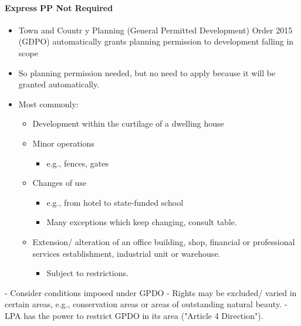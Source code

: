 \documentclass[
]{article}
\newenvironment{Shaded}{}{}
\newcommand{\NormalTok}[1]{#1}
\providecommand{\tightlist}{%
  \setlength{\itemsep}{0pt}\setlength{\parskip}{0pt}}
\begin{document}
\hypertarget{express-pp-not-required}{%
\paragraph{Express PP Not Required}\label{express-pp-not-required}}

\begin{itemize}
\tightlist
\item
  Town and Countr y Planning (General Permitted Development) Order 2015
  (GDPO) automatically grants planning permission to development falling
  in scope
\item
  So planning permission needed, but no need to apply because it will be
  granted automatically.
\item
  Most commonly:

  \begin{itemize}
  \tightlist
  \item
    Development within the curtilage of a dwelling house
  \item
    Minor operations

    \begin{itemize}
    \tightlist
    \item
      e.g., fences, gates
    \end{itemize}
  \item
    Changes of use

    \begin{itemize}
    \tightlist
    \item
      e.g., from hotel to state-funded school
    \item
      Many exceptions which keep changing, consult table.
    \end{itemize}
  \item
    Extension/ alteration of an office building, shop, financial or
    professional services establishment, industrial unit or warehouse.

    \begin{itemize}
    \tightlist
    \item
      Subject to restrictions.
    \end{itemize}
  \end{itemize}
\end{itemize}

\begin{Shaded}
\begin{Highlighting}[]
\NormalTok{{-} Consider conditions imposed under GPDO}
\NormalTok{{-} Rights may be excluded/ varied in certain areas, e.g., conservation areas or areas of outstanding natural beauty. }
\NormalTok{{-} LPA has the power to restrict GPDO in its area ("Article 4 Direction").}
\end{Highlighting}
\end{Shaded}
\end{document}

